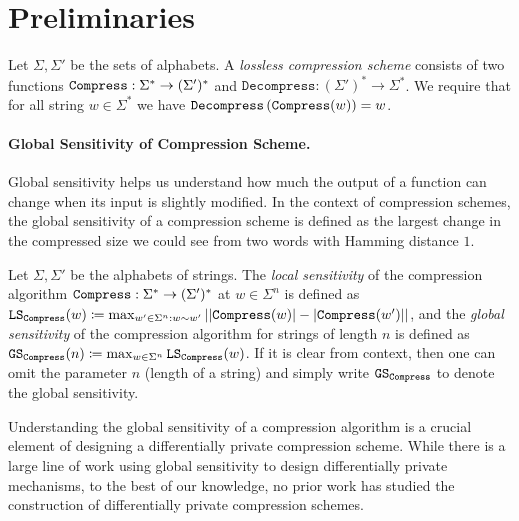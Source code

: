 \section{Preliminaries}

\begin{definition}
Let $\Sigma,\Sigma'$ be the sets of alphabets. A {\em lossless compression scheme} consists of two functions $\mathtt{Compress}:\Sigma^* \rightarrow (\Sigma')^*$ and $\mathtt{Decompress}:(\Sigma')^* \rightarrow \Sigma^*$. We require that for all string $w \in \Sigma^*$ we have $\mathtt{Decompress}\left(\mathtt{Compress}(w) \right) = w$.
\end{definition}

\paragraph*{Global Sensitivity of Compression Scheme.}

Global sensitivity helps us understand how much the output of a function can change when its input is slightly modified. In the context of compression schemes, the global sensitivity of a compression scheme is defined as the largest change in the compressed size we could see from two words with Hamming distance $1$.

\begin{definition}
Let $\Sigma,\Sigma'$ be the alphabets of strings. 
The \emph{local sensitivity} of the compression algorithm $\mathtt{Compress}:\Sigma^* \rightarrow (\Sigma')^*$ at $w \in \Sigma^n$ is defined as 
$\mathtt{LS}_{\mathtt{Compress}}(w) \coloneqq \max_{w' \in \Sigma^n:w \sim w'} \left| |\mathtt{Compress}(w)| - |\mathtt{Compress}(w')| \right|$,
and the \emph{global sensitivity} of the compression algorithm for strings of length $n$ is defined as
$ \mathtt{GS}_{\mathtt{Compress}}(n) \coloneqq \max_{w \in \Sigma^n} \mathtt{LS}_{\mathtt{Compress}}(w)$. 
If it is clear from context, then one can omit the parameter $n$ (length of a string) and simply write $\mathtt{GS}_{\mathtt{Compress}}$ to denote the global sensitivity.
\end{definition}

Understanding the global sensitivity of a compression algorithm is a crucial element of designing a differentially private compression scheme. While there is a large line of work using global sensitivity  \cite{sheng2025differentiallyprivatedistancequery,farias2025differentiallyprivatemultiobjectiveselection,wicker2024certificationdifferentiallyprivateprediction,10735286,10597947,zhang2023sensitivityestimationdifferentiallyprivate,tetek:LIPIcs.APPROX/RANDOM.2024.73,10.1145/3523227.3546781,9762326,blocki_et_al:LIPIcs.APPROX/RANDOM.2023.59,blocki_et_al:LIPIcs.ICALP.2022.26} to design differentially private mechanisms, to the best of our knowledge, no prior work has studied the construction of differentially private compression schemes.


